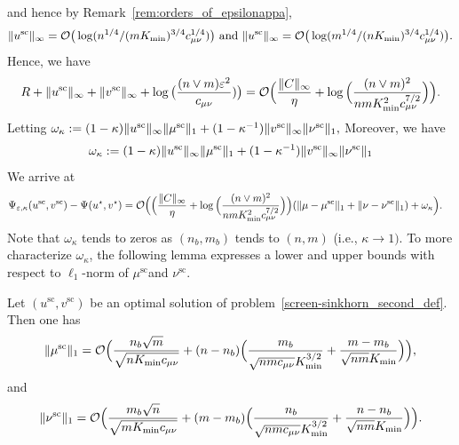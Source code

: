 and hence by Remark~\ref{rem:orders_of_epsilonappa}, 
\begin{equation*}
\|u^{\text{sc}}\|_\infty = \mathcal{O}\big(\log({n^{1/4}}/{(mK_{\min})^{3/4}c_{\mu\nu}^{1/4}})\big) \text{ and }\|u^{\text{sc}}\|_\infty =\mathcal{O}\big(\log({m^{1/4}}/{(nK_{\min})^{3/4}c_{\mu\nu}^{1/4}})\big).
\end{equation*}
Hence, we have 
\begin{align*}
R + \|u^{\text{sc}}\|_\infty  + \|v^{\text{sc}}\|_\infty + \log\big(\frac{(n\vee m)\varepsilon^2}{c_{\mu\nu}})\big) = \mathcal{O}\Big(\frac{\|C\|_\infty}{\eta} + \log\Big(\frac{(n\vee m)^2}{nmK_{\min}^{2}c_{\mu\nu}^{7/2}}\Big)\Big).
\end{align*}
Letting $\omega_{\kappa} := (1- \kappa)\|{u}^{\text{sc}}\|_\infty\|{\mu}^{\text{sc}}\|_1 + (1- \kappa^{-1})\|{v}^{\text{sc}}\|_\infty\|{\nu}^{\text{sc}}\|_1,$
Moreover, we have 
\begin{align*}
\omega_{\kappa} := (1- \kappa)\|{u}^{\text{sc}}\|_\infty\|{\mu}^{\text{sc}}\|_1 + (1- \kappa^{-1})\|{v}^{\text{sc}}\|_\infty\|{\nu}^{\text{sc}}\|_1
\end{align*}
We arrive at 
\begin{align*}
\Psi_{\varepsilon, \kappa}(u^{\text{sc}} ,v^{\text{sc}}) -\Psi(u^\star, v^\star) 
& = \mathcal{O}\Big(\Big(\frac{\|C\|_\infty}{\eta} + \log\Big(\frac{(n\vee m)^2}{nmK_{\min}^{2}c_{\mu\nu}^{7/2}}\Big)\Big)(\|\mu - {\mu}^{\text{sc}}\|_1 + \|\nu - \nu^{\text{sc}}\|_1) + \omega_{\kappa}\Big).
\end{align*}
Note that $\omega_{\kappa}$ tends to zeros as $(n_b,m_b)$ tends to $(n,m)$ (i.e., $\kappa \rightarrow 1)$. To more characterize $\omega_\kappa$, the following 
lemma expresses a lower and upper bounds with respect to $\ell_1$-norm of $\mu^{\text{sc}}$and $\nu^{\text{sc}}$. 
\begin{lemma}
\label{lemma_bounds_on_marginals}
Let $(u^{\text{sc}}, v^{\text{sc}})$ be an optimal solution of problem~\eqref{screen-sinkhorn_second_def}.
Then one has 
\begin{align}
\label{l1-norm-mu-sc}
\|\mu^{\text{sc}}\|_1 = \mathcal{O}\Big(\frac{n_b\sqrt{m}}{\sqrt{nK_{\min}c_{\mu\nu}}} + (n-n_b)\Big(\frac{m_b}{\sqrt{nmc_{\mu\nu}}K_{\min}^{3/2}} + \frac{m-m_b}{\sqrt{nm}K_{\min}}\Big)\Big),
\end{align}
and
\begin{align}
\label{l1-norm-nu-sc}
\|\nu^{\text{sc}}\|_1 = \mathcal{O}\Big(\frac{m_b\sqrt{n}}{\sqrt{mK_{\min}c_{\mu\nu}}} + (m-m_b)\Big(\frac{n_b}{\sqrt{nmc_{\mu\nu}}K_{\min}^{3/2}} + \frac{n-n_b}{\sqrt{nm}K_{\min}}\Big)\Big).
\end{align}
\end{lemma}


